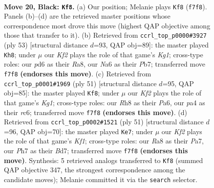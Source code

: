 \documentclass[11pt]{article}
\begin{document}
\clearpage

\begin{figure}[p]\centering
\begin{subfigure}{0.46\textwidth}\centering
\resizebox{\linewidth}{!}{%
\newchessgame
\chessboard[
  setfen={r2q3r/3p1k1p/n2P4/2pQb3/P5P1/2N5/1P6/R3K2R b KQ - 1 20},
  showmover=false,
  pgfstyle=straightmove, color=movearrow, markmove={f7-f8}
]}
\caption{}
\end{subfigure}\hfill
\begin{subfigure}{0.46\textwidth}\centering
\resizebox{\linewidth}{!}{%
\newchessgame
\chessboard[
  setfen={r4rk1/1p2R1b1/2p1Q1p1/2P5/p7/6P1/1q2PP1P/5RK1 b - - 7 27},
  showmover=false,
  pgfstyle=straightmove, color=movearrow, markmove={g8-h8}
]}
\caption{}
\end{subfigure}
\\[4pt]
\begin{subfigure}{0.46\textwidth}\centering
\resizebox{\linewidth}{!}{%
\newchessgame
\chessboard[
  setfen={rq4k1/7p/ppR1Qpb1/5nN1/P4P2/8/1P4PP/6K1 b - - 1 26},
  showmover=false,
  pgfstyle=straightmove, color=movearrow, markmove={g8-f8}
]}
\caption{}
\end{subfigure}\hfill
\begin{subfigure}{0.46\textwidth}\centering
\resizebox{\linewidth}{!}{%
\newchessgame
\chessboard[
  setfen={5k1Q/p2b4/1np2rp1/4q1N1/8/7P/PP3PP1/3R2K1 b - - 1 26},
  showmover=false,
  pgfstyle=straightmove, color=movearrow, markmove={f8-e7}
]}
\caption{}
\end{subfigure}
\caption{\textbf{Move 20, Black: \texttt{Kf8}.} (a) Our position; Melanie plays \texttt{Kf8} (\texttt{f7f8}). Panels (b)--(d) are the retrieved master positions whose correspondence most drove this move (highest QAP objective among those that transfer to it). (b) Retrieved from \texttt{ccrl\_top\_p0000\#3927} (ply 53) [structural distance $d$=93, QAP obj=89]: the master played \texttt{Kh8}; under $\mu$ our \emph{Kf2} plays the role of that game's \emph{Kg1}; cross-type roles: our \emph{p}d6 as their \emph{R}a8, our \emph{N}a6 as their \emph{P}b7; transferred move \texttt{f7f8} \textbf{(endorses this move)}. (c) Retrieved from \texttt{ccrl\_top\_p0001\#1969} (ply 51) [structural distance $d$=95, QAP obj=85]: the master played \texttt{Kf8}; under $\mu$ our \emph{Kf2} plays the role of that game's \emph{Kg1}; cross-type roles: our \emph{R}h8 as their \emph{P}a6, our \emph{p}a4 as their \emph{r}c6; transferred move \texttt{f7f8} \textbf{(endorses this move)}. (d) Retrieved from \texttt{ccrl\_top\_p0002\#1521} (ply 51) [structural distance $d$=96, QAP obj=70]: the master played \texttt{Ke7}; under $\mu$ our \emph{Kf2} plays the role of that game's \emph{Kf1}; cross-type roles: our \emph{R}a8 as their \emph{P}a7, our \emph{P}h7 as their \emph{B}d7; transferred move \texttt{f7f8} \textbf{(endorses this move)}. Synthesis: 5 retrieved analogs transferred to \texttt{Kf8} (summed QAP objective 347, the strongest correspondence among the candidate moves); Melanie committed it via the \texttt{search} selector.}
\label{fig:thought-m39}
\end{figure}
\end{document}
